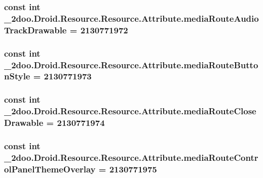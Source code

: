 \hypertarget{class__2doo_1_1_droid_1_1_resource_1_1_attribute_8dfb9d2ec53e990e751f5c20b64651ac}{
\subsubsection[{mediaRouteAudioTrackDrawable}]{\setlength{\rightskip}{0pt plus 5cm}const int \_\-2doo.Droid.Resource.Resource.Attribute.mediaRouteAudioTrackDrawable = 2130771972}}
\label{class__2doo_1_1_droid_1_1_resource_1_1_attribute_8dfb9d2ec53e990e751f5c20b64651ac}


\hypertarget{class__2doo_1_1_droid_1_1_resource_1_1_attribute_5adb7486f286e08bfa84d059d8986cd4}{
\subsubsection[{mediaRouteButtonStyle}]{\setlength{\rightskip}{0pt plus 5cm}const int \_\-2doo.Droid.Resource.Resource.Attribute.mediaRouteButtonStyle = 2130771973}}
\label{class__2doo_1_1_droid_1_1_resource_1_1_attribute_5adb7486f286e08bfa84d059d8986cd4}


\hypertarget{class__2doo_1_1_droid_1_1_resource_1_1_attribute_264b307398a55b3695873b0197dbe95b}{
\subsubsection[{mediaRouteCloseDrawable}]{\setlength{\rightskip}{0pt plus 5cm}const int \_\-2doo.Droid.Resource.Resource.Attribute.mediaRouteCloseDrawable = 2130771974}}
\label{class__2doo_1_1_droid_1_1_resource_1_1_attribute_264b307398a55b3695873b0197dbe95b}


\hypertarget{class__2doo_1_1_droid_1_1_resource_1_1_attribute_fd6f799f8a3e18b45a9feb798e1856fe}{
\subsubsection[{mediaRouteControlPanelThemeOverlay}]{\setlength{\rightskip}{0pt plus 5cm}const int \_\-2doo.Droid.Resource.Resource.Attribute.mediaRouteControlPanelThemeOverlay = 2130771975}}
\label{class__2doo_1_1_droid_1_1_resource_1_1_attribute_fd6f799f8a3e18b45a9feb798e1856fe}


